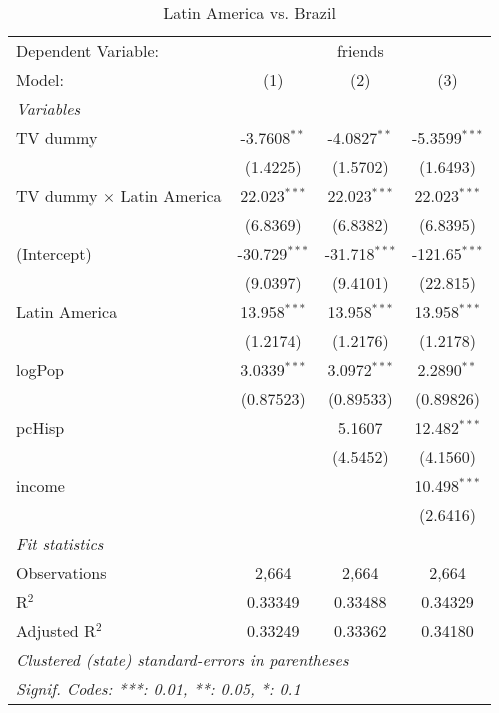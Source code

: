 \begin{table}[htbp]
\centering
\caption{Latin America vs. Brazil}
\begin{tabular}{lccc}
\tabularnewline\midrule\midrule
Dependent Variable:&\multicolumn{3}{c}{friends}\\
Model:&(1) & (2) & (3)\\
\midrule \emph{Variables}&   &   &  \\
TV dummy & -3.7608$^{**}$ & -4.0827$^{**}$ & -5.3599$^{***}$\\
  &(1.4225) & (1.5702) & (1.6493)\\
TV dummy $\times$ Latin America & 22.023$^{***}$ & 22.023$^{***}$ & 22.023$^{***}$\\
  &(6.8369) & (6.8382) & (6.8395)\\
(Intercept) & -30.729$^{***}$ & -31.718$^{***}$ & -121.65$^{***}$\\
  &(9.0397) & (9.4101) & (22.815)\\
Latin America & 13.958$^{***}$ & 13.958$^{***}$ & 13.958$^{***}$\\
  &(1.2174) & (1.2176) & (1.2178)\\
logPop & 3.0339$^{***}$ & 3.0972$^{***}$ & 2.2890$^{**}$\\
  &(0.87523) & (0.89533) & (0.89826)\\
pcHisp &    & 5.1607 & 12.482$^{***}$\\
  &   & (4.5452) & (4.1560)\\
income &    &    & 10.498$^{***}$\\
  &   &    & (2.6416)\\
\midrule \emph{Fit statistics}&  & & \\
Observations & 2,664&2,664&2,664\\
R$^2$ & 0.33349&0.33488&0.34329\\
Adjusted R$^2$ & 0.33249&0.33362&0.34180\\
\midrule\midrule\multicolumn{4}{l}{\emph{Clustered (state) standard-errors in parentheses}}\\
\multicolumn{4}{l}{\emph{Signif. Codes: ***: 0.01, **: 0.05, *: 0.1}}\\
\end{tabular}
\end{table}

